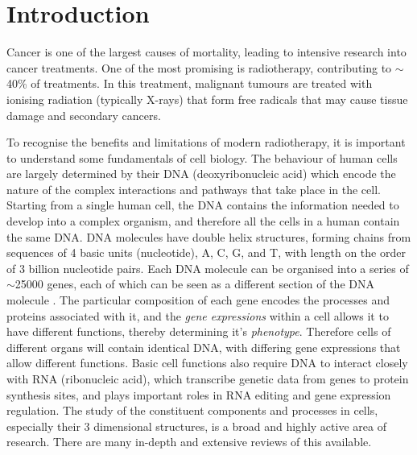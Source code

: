 \documentclass[NOTE, disdraft=true, UKenglish]{\DISCDTLATEXPATH UCLCDTDISdoc}
\begin{document}
\maketitle

\tableofcontents

\clearpage


\newpage

\newpage
\section{Introduction}
\label{sec:introduction}
Cancer is one of the largest causes of mortality, leading to intensive research into cancer treatments. One of the most promising is radiotherapy, contributing to $\sim$40\% of treatments. In this treatment, malignant tumours are treated with ionising radiation (typically X-rays) that form free radicals that may cause tissue damage and secondary cancers. 

To recognise the benefits and limitations of modern radiotherapy, it is important to understand some fundamentals of cell biology. The behaviour of human cells are largely determined by their DNA (deoxyribonucleic acid) which encode the nature of the complex interactions and pathways that take place in the cell. Starting from a single human cell, the DNA contains the information needed to develop into a complex organism, and therefore all the cells in a human contain the same DNA. DNA molecules have double helix structures, forming chains from sequences of 4 basic units (nucleotide), A, C, G, and T, with length on the order of 3 billion nucleotide pairs. Each DNA molecule can be organised into a series of $\sim$25000 genes, each of which can be seen as a different section of the DNA molecule \cite{genetics_basics}. The particular composition of each gene encodes the processes and proteins associated with it, and the \textit{gene expressions} within a cell allows it to have different functions, thereby determining it's \textit{phenotype}. Therefore cells of different organs will contain identical DNA, with differing gene expressions that allow different functions. Basic cell functions also require DNA to interact closely with RNA (ribonucleic acid), which transcribe genetic data from genes to protein synthesis sites, and plays important roles in RNA editing and gene expression regulation. \cite{RNA} The study of the constituent components and processes in cells, especially their 3 dimensional structures, is a broad and highly active area of research. There are many in-depth and extensive reviews of this available.
\end{document}
